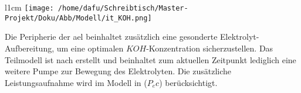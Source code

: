 \documentclass[onecolumn,10pt,titlepage]{article}
\begin{document}


\begin{wrapfigure}{l}{1cm}
	\texttt{[image: /home/dafu/Schreibtisch/Master-Projekt/Doku/Abb/Modell/it\_KOH.png]}
\end{wrapfigure}
Die Peripherie der \gls{ael} beinhaltet zusätzlich eine gesonderte Elektrolyt-Aufbereitung, um eine optimalen $KOH$-Konzentration sicherzustellen. Das Teilmodell ist nach \cite{Abdin.2015} erstellt und beinhaltet zum aktuellen Zeitpunkt lediglich eine weitere Pumpe zur Bewegung des Elektrolyten. Die zusätzliche Leistungsaufnahme wird im Modell in ($P_ec$) berücksichtigt.
\newline
\end{document}
